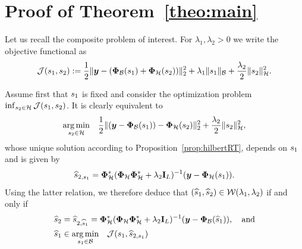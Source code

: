 
\clearpage
\appendix

\section{Proof of Theorem~\ref{theo:main}}
\label{app:prooftheo1}

    Let us recall the composite problem of interest. For $\lambda_1, \lambda_2 > 0$ we write the objective functional as
    \begin{equation*}
        \mathcal{J}(s_1, s_2) := \frac{1}{2} \| \bm{y} - (\bm{\Phi}_\mathcal{B} (s_1) + \bm{\Phi}_\mathcal{H} (s_2)) \|_2^2  + \lambda_{1} \| s_1 \|_{\mathcal{B}} + \frac{\lambda_{2}}{2} \| s_2 \|_{\mathcal{H}}^2.
    \end{equation*}
    
    
    Assume first that $s_1$ is fixed and consider the optimization problem $\inf_{s_2 \in \mathcal{H}} \mathcal{J}(s_1, s_2)$. It is clearly equivalent to
    \begin{equation*}
        \underset{s_2 \in \mathcal{H}}{\arg\min}  \quad \frac{1}{2} \| (\bm{y} - \bm{\Phi}_\mathcal{B}(s_1)) - \bm{\Phi}_\mathcal{H}(s_2) \|_2^2 + \frac{\lambda_{2}}{2} \| s_2 \|_{\mathcal{H}}^2,
    \end{equation*}
    whose unique solution according to Proposition~\ref{prop:hilbertRT}, depends on $s_1$ and is given by
    \begin{equation}
        \label{eq:hatfwithfb}
        \widehat{s}_{2, s_1} =\bm{\Phi}_\mathcal{H}^* ( \bm{\Phi}_\mathcal{H} \bm{\Phi}_\mathcal{H}^* + \lambda_{2} \mathbf{I}_L)^{-1} ( \bm{y} - \bm{\Phi}_\mathcal{H}(s_1) ). 
    \end{equation}
    Using the latter relation, we therefore deduce that $(\widehat{s}_1,\widehat{s}_2) \in \mathcal{W} (\lambda_{1},\lambda_{2})$ if and only if  
    \begin{align}
        \widehat{s}_2 &= \widehat{s}_{2,\widehat{s}_1} = \bm{\Phi}_\mathcal{H}^* ( \bm{\Phi}_\mathcal{H} \bm{\Phi}_\mathcal{H}^* + \lambda_{2} \mathbf{I}_L)^{-1} ( \bm{y} - \bm{\Phi}_\mathcal{B}(\widehat{s}_1) ) , \quad \text{and} \label{eq:findmethishfh}\\
        \widehat{s}_1 &\in\underset{s_1 \in \mathcal{B}}{\arg\min}  \quad \mathcal{J}(s_1, \widehat{s}_{2, s_1}) \label{eq:newhproblem}
    \end{align}

